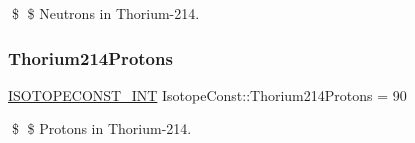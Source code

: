 \$ \$ Neutrons in Thorium-\/214. \mbox{\label{group___isotope_const-_thorium-_th214_gaf106865dc617bf904ee9de268b71bdd8}} 
\subsubsection{\texorpdfstring{Thorium214\+Protons}{Thorium214Protons}}
{\footnotesize\ttfamily \mbox{\hyperlink{group___isotope_const-_macros_ga5f18360b3e99483a35c32d789e62621c}{I\+S\+O\+T\+O\+P\+E\+C\+O\+N\+S\+T\+\_\+\+I\+NT}} Isotope\+Const\+::\+Thorium214\+Protons = 90}

\$ \$ Protons in Thorium-\/214. 